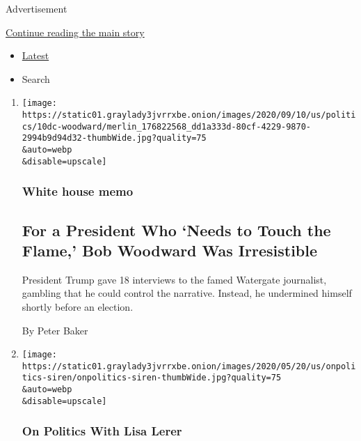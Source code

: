 Advertisement

\protect\hyperlink{after-mid4}{Continue reading the main story}

\begin{itemize}
\tightlist
\item
  \protect\hyperlink{stream-panel}{Latest}
\item
  Search
\end{itemize}

\begin{enumerate}
\def\labelenumi{\arabic{enumi}.}
\item
  \href{/2020/09/10/us/politics/trump-woodward.html}{}

  \texttt{[image: https://static01.graylady3jvrrxbe.onion/images/2020/09/10/us/politics/10dc-woodward/merlin\_176822568\_dd1a333d-80cf-4229-9870-2994b9d94d32-thumbWide.jpg?quality=75\\\&auto=webp\\\&disable=upscale]}

  \hypertarget{white-house-memo}{%
  \subsubsection{White house memo}\label{white-house-memo}}

  \hypertarget{for-a-president-who-needs-to-touch-the-flame-bob-woodward-was-irresistible}{%
  \subsection{For a President Who `Needs to Touch the Flame,' Bob
  Woodward Was
  Irresistible}\label{for-a-president-who-needs-to-touch-the-flame-bob-woodward-was-irresistible}}

  President Trump gave 18 interviews to the famed Watergate journalist,
  gambling that he could control the narrative. Instead, he undermined
  himself shortly before an election.

  By Peter Baker
\item
  \href{/2020/09/10/us/politics/trump-woodward-coronavirus.html}{}

  \texttt{[image: https://static01.graylady3jvrrxbe.onion/images/2020/05/20/us/onpolitics-siren/onpolitics-siren-thumbWide.jpg?quality=75\\\&auto=webp\\\&disable=upscale]}

  \hypertarget{on-politics-with-lisa-lerer}{%
  \subsubsection{On Politics With Lisa
  Lerer}\label{on-politics-with-lisa-lerer}}


\end{enumerate}
